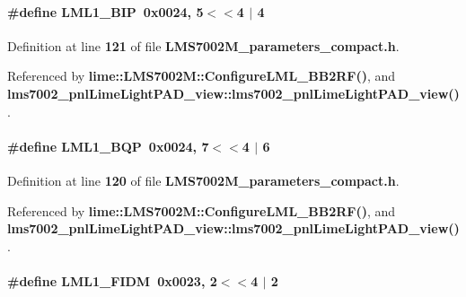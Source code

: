 \paragraph[{L\+M\+L1\+\_\+\+B\+IP}]{\setlength{\rightskip}{0pt plus 5cm}\#define L\+M\+L1\+\_\+\+B\+IP~0x0024, 5$<$$<$4 $\vert$  4}\label{LMS7002M__parameters__compact_8h_a76db9fd086a39fb53c0e62d9b03730a6}


Definition at line {\bf 121} of file {\bf L\+M\+S7002\+M\+\_\+parameters\+\_\+compact.\+h}.



Referenced by {\bf lime\+::\+L\+M\+S7002\+M\+::\+Configure\+L\+M\+L\+\_\+\+B\+B2\+R\+F()}, and {\bf lms7002\+\_\+pnl\+Lime\+Light\+P\+A\+D\+\_\+view\+::lms7002\+\_\+pnl\+Lime\+Light\+P\+A\+D\+\_\+view()}.

\paragraph[{L\+M\+L1\+\_\+\+B\+QP}]{\setlength{\rightskip}{0pt plus 5cm}\#define L\+M\+L1\+\_\+\+B\+QP~0x0024, 7$<$$<$4 $\vert$  6}\label{LMS7002M__parameters__compact_8h_ac1675e5b53ea917fb1eaaddbc8f8bd40}


Definition at line {\bf 120} of file {\bf L\+M\+S7002\+M\+\_\+parameters\+\_\+compact.\+h}.



Referenced by {\bf lime\+::\+L\+M\+S7002\+M\+::\+Configure\+L\+M\+L\+\_\+\+B\+B2\+R\+F()}, and {\bf lms7002\+\_\+pnl\+Lime\+Light\+P\+A\+D\+\_\+view\+::lms7002\+\_\+pnl\+Lime\+Light\+P\+A\+D\+\_\+view()}.

\paragraph[{L\+M\+L1\+\_\+\+F\+I\+DM}]{\setlength{\rightskip}{0pt plus 5cm}\#define L\+M\+L1\+\_\+\+F\+I\+DM~0x0023, 2$<$$<$4 $\vert$  2}\label{LMS7002M__parameters__compact_8h_abde1b5f2f705d5900d83e883c2b0949f}


